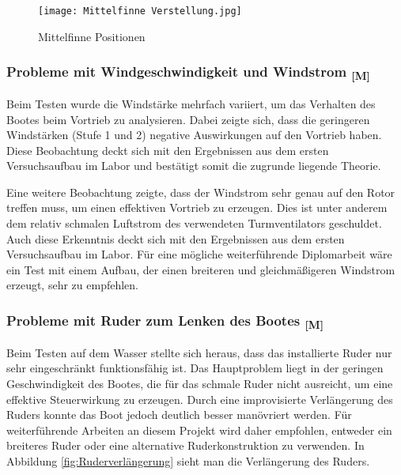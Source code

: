 \documentclass[a4paper,12pt]{article}
\begin{document}
\begin{figure}[H]
    \centering
    \texttt{[image: Mittelfinne Verstellung.jpg]}
    \caption{Mittelfinne Positionen}
    \label{fig:Mittelfinne Positionen}
\end{figure}

\newpage

\subsubsection{\texorpdfstring{Probleme mit Windgeschwindigkeit und Windstrom \textsubscript{[M]}}{Probleme mit Windgeschwindigkeit und Windstrom [M]}}


Beim Testen wurde die Windstärke mehrfach variiert, um das Verhalten des Bootes beim Vortrieb zu analysieren. Dabei zeigte sich, dass die geringeren Windstärken (Stufe 1 und 2) negative Auswirkungen auf den Vortrieb haben. Diese Beobachtung deckt sich mit den Ergebnissen aus dem ersten Versuchsaufbau im Labor und bestätigt somit die zugrunde liegende Theorie.\newline

Eine weitere Beobachtung zeigte, dass der Windstrom sehr genau auf den Rotor treffen muss, um einen effektiven Vortrieb zu erzeugen. Dies ist unter anderem dem relativ schmalen Luftstrom des verwendeten Turmventilators geschuldet. Auch diese Erkenntnis deckt sich mit den Ergebnissen aus dem ersten Versuchsaufbau im Labor. Für eine mögliche weiterführende Diplomarbeit wäre ein Test mit einem Aufbau, der einen breiteren und gleichmäßigeren Windstrom erzeugt, sehr zu empfehlen.

\subsubsection{\texorpdfstring{Probleme mit Ruder zum Lenken des Bootes \textsubscript{[M]}}{Probleme mit Ruder zum Lenken des Bootes [M]}}

Beim Testen auf dem Wasser stellte sich heraus, dass das installierte Ruder nur sehr eingeschränkt funktionsfähig ist. Das Hauptproblem liegt in der geringen Geschwindigkeit des Bootes, die für das schmale Ruder nicht ausreicht, um eine effektive Steuerwirkung zu erzeugen. Durch eine improvisierte Verlängerung des Ruders konnte das Boot jedoch deutlich besser manövriert werden. Für weiterführende Arbeiten an diesem Projekt wird daher empfohlen, entweder ein breiteres Ruder oder eine alternative Ruderkonstruktion zu verwenden. In Abbildung \ref{fig:Ruderverlängerung} sieht man die Verlängerung des Ruders.
\end{document}
